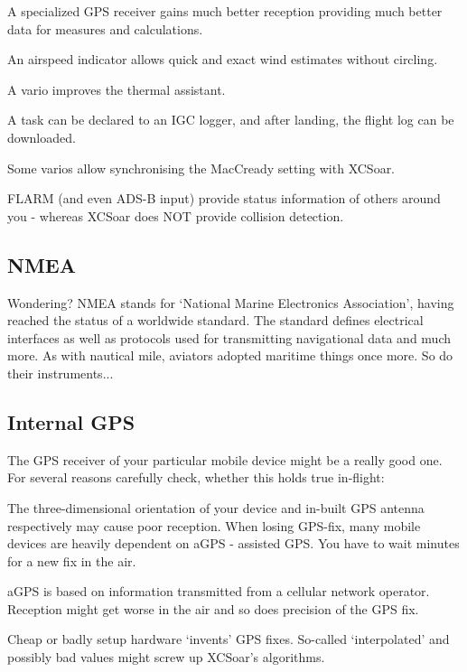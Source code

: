 \documentclass[english,a4paper,12pt]{refrep}
\begin{document}
\begin{compactitem}
\item A specialized GPS receiver gains much better reception providing much 
better data for measures and calculations.
\item An airspeed indicator allows quick and exact wind estimates without 
circling.
\item A vario improves the thermal assistant.
\item A task can be declared to an IGC logger, and after landing, the 
flight log can be downloaded.
\item Some varios allow synchronising the MacCready setting with XCSoar.
\item FLARM (and even ADS-B input) provide status information of others
around you - whereas XCSoar does NOT provide collision detection.
\end{compactitem}

\subsection{\textcolor{flashblue}{NMEA}}
Wondering?  NMEA stands for `National Marine Electronics Association', having 
reached the status of a worldwide standard. The standard defines electrical
interfaces as well as protocols used for transmitting navigational data and 
much more. As with nautical mile, aviators adopted maritime things once
more. So do their instruments...

\subsection{\textcolor{flashblue}{Internal GPS}}
The GPS receiver of your particular mobile device might be a really good one. 
For several reasons carefully check, whether this holds true in-flight:

\begin{compactitem}
\item The three-dimensional orientation of your device and in-built GPS 
antenna respectively may cause poor reception.  When losing GPS-fix, many
mobile devices are heavily dependent on aGPS - assisted GPS.  You have to wait 
minutes for a new fix in the air.
\item aGPS is based on information transmitted from a cellular network 
operator. Reception might get worse in the air and so does precision of the 
GPS fix.
\item Cheap or badly setup hardware `invents' GPS fixes. So-called 
`interpolated' and possibly bad values might screw up XCSoar's algorithms.
\end{compactitem}
\end{document}
